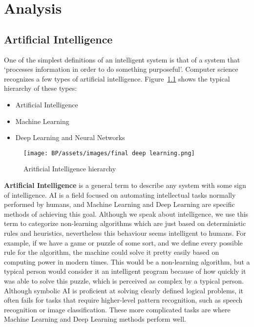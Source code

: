 \chapter{Analysis}

\section{Artificial Intelligence} %
One of the simplest definitions of an intelligent system is that of a system
that ‘processes information in order to do something purposeful’.\cite{Dignum_2019}
Computer science recognizes a few types of artificial intelligence. Figure~\ref{fig:AI-ML-DL-NN} shows the typical hierarchy of these types:

\begin{itemize}
    \item Artificial Intelligence
    \item Machine Learning
    \item Deep Learning and Neural Networks
\end{itemize}

\begin{figure}[h]
\begin{centering}
\texttt{[image: BP/assets/images/final deep learning.png]}
\par\end{centering}
\caption{Aritficial Intelligence hierarchy\cite{ai_hierarchy_pic}
\label{fig:AI-ML-DL-NN}}
\end{figure}


\textbf{Artificial Intelligence} is a general term to describe any system with some sign of intelligence. AI is a field focused on automating intellectual tasks normally performed by humans, and Machine Learning and Deep Learning are specific methods of achieving this goal.\cite{AI-ML-DL} Although we speak about intelligence, we use this term to categorize non-learning algorithms which are just based on deterministic rules and heuristics, nevertheless this behaviour seems intelligent to humans. For example, if we have a game or puzzle of some sort, and we define every possible rule for the algorithm, the machine could solve it pretty easily based on computing power in modern times. This would be a non-learning algorithm, but a typical person would consider it an intelligent program because of how quickly it was able to solve this puzzle, which is perceived as complex by a typical person. Although symbolic AI is proficient at solving clearly defined logical problems, it often fails for tasks that require higher-level pattern recognition, such as speech recognition or image classification. These more complicated tasks are where Machine Learning and Deep Learning methods perform well.\cite{AI-ML-DL}

